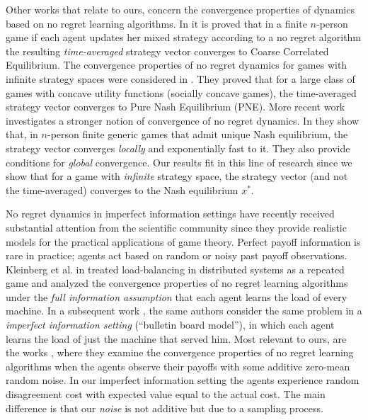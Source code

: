 Other works that relate to ours, concern the convergence properties of dynamics
based on no regret learning algorithms.  In \cite{FV97,FS99,SA00,SALS15} it is
proved that in a finite $n$-person game if each agent updates her mixed
strategy according to a no regret algorithm the resulting \emph{time-averaged}
strategy vector converges to Coarse Correlated Equilibrium. The convergence
properties of no regret dynamics for games with infinite strategy spaces were
considered in \cite{EMN09}.  They proved that for a large class of games with
concave utility functions (socially concave games), the time-averaged strategy
vector converges to Pure Nash Equilibrium (PNE). More recent work investigates a stronger notion of
convergence of no regret dynamics. In \cite{CHM17} they show that, in
$n$-person finite generic games that admit unique Nash equilibrium, the
strategy vector converges \emph{locally} and exponentially fast to it. They
also provide conditions for \emph{global} convergence.  Our results fit in this
line of research since we show that for a game with \emph{infinite} strategy
space, the strategy vector (and not the time-averaged) converges to the Nash
equilibrium $x^*$.

No regret dynamics in imperfect information settings have recently received
substantial attention from the scientific community since they provide
realistic models for the practical applications of game theory.  Perfect payoff
information is rare in practice; agents act based on random or noisy past
payoff observations.  Kleinberg et al. in \cite{KPT09} treated load-balancing
in distributed systems as a repeated game and analyzed the convergence
properties of no regret learning algorithms under the \emph{full information
  assumption} that each agent learns the load of every machine.  In a
subsequent work \cite{KPT11}, the same authors consider the same problem in a
\emph{imperfect information setting} (\enquote{bulletin board model}), in which
each agent learns the load of just the machine that served him. Most relevant
to ours, are the works \cite{HCM17,MS17,BM17,CHM17}, where they examine the
convergence properties of no regret learning algorithms when the agents
observe their payoffs with some additive zero-mean random noise. In our
imperfect information setting the agents experience random disagreement cost
with expected value equal to the actual cost.  The main difference is that
our \emph{noise} is not additive but due to a sampling process.

